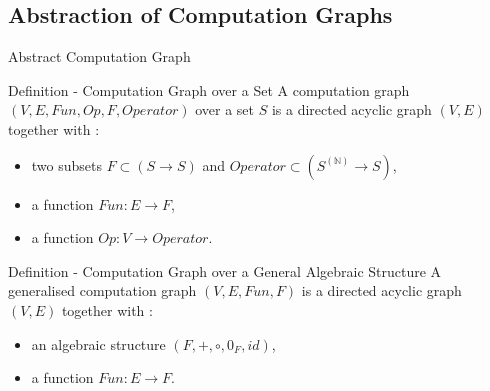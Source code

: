 \documentclass[11pt]{beamer}
\newcommand{\bb}[1]{\mathbb{#1}}
\begin{document}
\subsection{Abstraction of Computation Graphs}
\begin{frame}{Abstract Computation Graph}

\begin{block}{Definition - Computation Graph over a Set}
A computation graph $(V,E,Fun,Op,F,Operator)$ over a set $S$ is a directed acyclic graph $(V,E)$ together with :

\begin{itemize}

	\item two subsets $F \subset (S \to S)$ and $Operator \subset (S^{(\bb{N})} \to S)$,

	\item a function $Fun : E \to F$,
	
	\item a function $Op : V \to Operator$.
		
\end{itemize}
\end{block}

\begin{block}{Definition - Computation Graph over a General Algebraic Structure}
A generalised computation graph $(V,E,Fun,F)$ is a directed acyclic graph $(V,E)$ together with :

\begin{itemize}

	\item an algebraic structure $(F,+,\circ,0_F,id)$,

	\item a function $Fun : E \to F$.
		
\end{itemize}
\end{block}

\end{frame}
\end{document}
